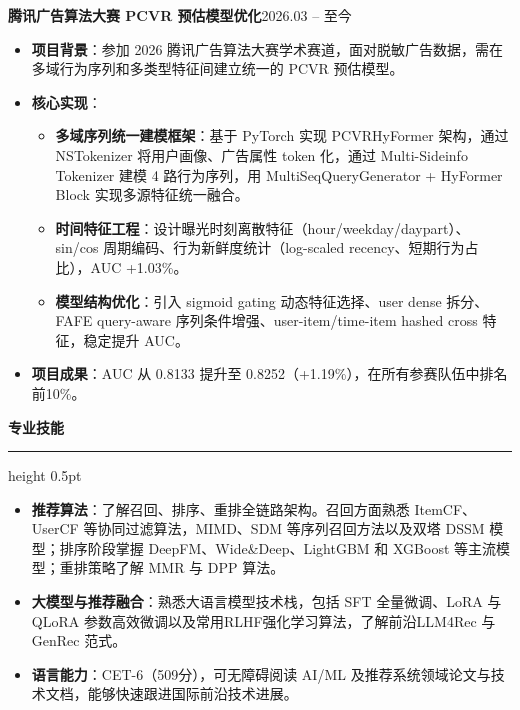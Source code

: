 \documentclass[11pt,a4paper]{article}
\newcommand{\sectionHead}[1]{%
    \vspace{0.3em}%
    \textbf{\large\textcolor{resumeBlue}{#1}}\\[-0.3em]%
    \textcolor{resumeBlue}{\hrule height 0.5pt}%
    \vspace{0.3em}%
}
\newcommand{\datedsubsection}[2]{%
    \vspace{0.2em}%
    \noindent\textbf{#1}\hfill #2\par%
}
\begin{document}
\datedsubsection{腾讯广告算法大赛 PCVR 预估模型优化}{2026.03 -- 至今}
\begin{itemize}
    \item \textbf{项目背景}：参加 2026 腾讯广告算法大赛学术赛道，面对脱敏广告数据，需在多域行为序列和多类型特征间建立统一的 PCVR 预估模型。
    \item \textbf{核心实现}：
    \begin{itemize}
        \item \textbf{多域序列统一建模框架}：基于 PyTorch 实现 PCVRHyFormer 架构，通过 NSTokenizer 将用户画像、广告属性 token 化，通过 Multi-Sideinfo Tokenizer 建模 4 路行为序列，用 MultiSeqQueryGenerator + HyFormer Block 实现多源特征统一融合。
        \item \textbf{时间特征工程}：设计曝光时刻离散特征（hour/weekday/daypart）、sin/cos 周期编码、行为新鲜度统计（log-scaled recency、短期行为占比），AUC +1.03\%。
        \item \textbf{模型结构优化}：引入 sigmoid gating 动态特征选择、user dense 拆分、FAFE query-aware 序列条件增强、user-item/time-item hashed cross 特征，稳定提升 AUC。
    \end{itemize}
    \item \textbf{项目成果}：AUC 从 0.8133 提升至 0.8252（+1.19\%），在所有参赛队伍中排名前10\%。
\end{itemize}


\sectionHead{专业技能}
\begin{itemize}
    \item \textbf{推荐算法}：了解召回、排序、重排全链路架构。召回方面熟悉 ItemCF、UserCF 等协同过滤算法，MIMD、SDM 等序列召回方法以及双塔 DSSM 模型；排序阶段掌握 DeepFM、Wide\&Deep、LightGBM 和 XGBoost 等主流模型；重排策略了解 MMR 与 DPP 算法。
    \item \textbf{大模型与推荐融合}：熟悉大语言模型技术栈，包括 SFT 全量微调、LoRA 与 QLoRA 参数高效微调以及常用RLHF强化学习算法，了解前沿LLM4Rec 与 GenRec 范式。
    \item \textbf{语言能力}：CET-6（509分），可无障碍阅读 AI/ML 及推荐系统领域论文与技术文档，能够快速跟进国际前沿技术进展。
\end{itemize}
\end{document}
